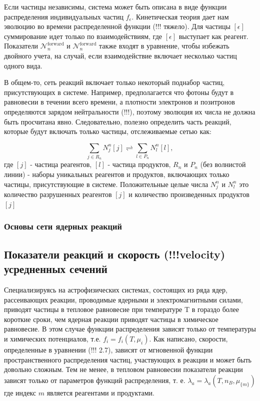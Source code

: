 \documentclass[%
master,    %
natbib,      %
subf,        %
href,        %
colorlinks,  %
]{disser}
\begin{document}
Если частицы независимы, система может быть описана в виде функции распределения индивидуальных частиц $f_\epsilon$. Кинетическая теория дает нам эволюцию во времени распределенной функции \cite{tt} (!!! тяжело). Для частицы $[\epsilon]$ суммирование идет только по взаимодействиям, где $[\epsilon]$ выступает как реагент. Показатели $\mathcal{N}_n^{\text{forward}}$ и $\mathcal{N}_n^{\text{forward}}$ также входят в уравнение, чтобы избежать двойного учета, на случай, если взаимодействие включает несколько частиц одного вида.

В общем-то, сеть реакций включает только некоторый поднабор частиц, присутствующих в системе. Например, предполагается что фотоны будут в равновесии в течении всего времени, а плотности электронов и позитронов определяются зарядом нейтральности (!!!), поэтому эволюция их числа не должна быть просчитана явно. Следовательно, полезно определить часть реакций, которые будут включать только частицы, отслеживаемые сетью как:

$$
\sum_{j \in R_n} N_j^n [j] \rightleftharpoons \sum_{l \in P_n} N_l^n [l],
$$	
где $[j]$ - частица реагентов, $[l]$ - частица продуктов, $R_n$ и $P_n$ (без волнистой линии) - наборы уникальных реагентов и продуктов, включающих только частицы, присутствующие в системе. Положительные целые числа $N_j^n$ и $N_l^n$ это количество разрушенных реагентов $[j]$ и количество произведенных продуктов $[j]$
\subsubsection{Основы сети ядерных реакций}

\subsection{Показатели реакций и скорость (!!!velocity) усредненных сечений}
Специализируясь на астрофизических системах, состоящих из ряда ядер, рассеивающих реакции, проводимые ядерными и электромагнитными силами, приводят частицы в тепловое равновесие при температуре T в гораздо более короткие сроки, чем ядерная реакции приводят частицы в химическое равновесие. В этом случае функции распределения зависят только от температуры и химических потенциалов, т.е. $f_i = f_i(T, \mu_i)$. Как написано, скорости, определенные в уравнении (!!! 2.7), зависят от мгновенной функции пространственного распределения частиц, участвующих в реакции и может быть довольно сложным. Тем не менее, в тепловом равновесии показатели реакции зависят только от параметров функций распределения, т. е. $\lambda_a = \lambda_a(T, n_B, \mu_{\{m\}})$
где индекс $m$ является реагентами и продуктами. 
\end{document}
